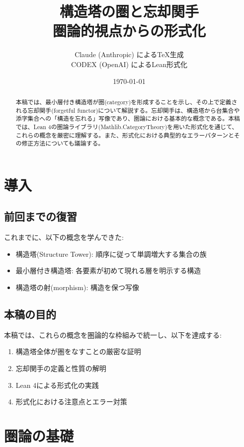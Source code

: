 \documentclass[a4paper,12pt]{article}
\title{構造塔の圏と忘却関手\\
\large 圏論的視点からの形式化}
\author{Claude (Anthropic) によるTeX生成\\CODEX (OpenAI) によるLean形式化}
\date{\today}
\theoremstyle{definition}
\begin{document}
\maketitle

\begin{abstract}
本稿では、最小層付き構造塔が圏(category)を形成することを示し、その上で定義される忘却関手(forgetful functor)について解説する。忘却関手は、構造塔から台集合や添字集合への「構造を忘れる」写像であり、圏論における基本的な概念である。本稿では、Lean 4の圏論ライブラリ(Mathlib.CategoryTheory)を用いた形式化を通じて、これらの概念を厳密に理解する。また、形式化における典型的なエラーパターンとその修正方法についても議論する。
\end{abstract}

\tableofcontents

\section{導入}

\subsection{前回までの復習}

これまでに、以下の概念を学んできた:
\begin{itemize}
\item 構造塔(Structure Tower): 順序に従って単調増大する集合の族
\item 最小層付き構造塔: 各要素が初めて現れる層を明示する構造
\item 構造塔の射(morphism): 構造を保つ写像
\end{itemize}

\subsection{本稿の目的}

本稿では、これらの概念を圏論的な枠組みで統一し、以下を達成する:
\begin{enumerate}
\item 構造塔全体が圏をなすことの厳密な証明
\item 忘却関手の定義と性質の解明
\item Lean 4による形式化の実践
\item 形式化における注意点とエラー対策
\end{enumerate}

\section{圏論の基礎}
\end{document}

